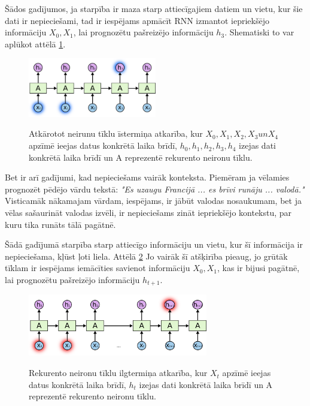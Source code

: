\documentclass[12pt,paper=A4]{report}
\begin{document}
    Šādos gadījumos, ja starpība ir maza starp attiecīgajiem datiem un vietu, kur šie dati ir nepieciešami, tad ir iespējams apmācīt RNN izmantot iepriekšējo informāciju $X_0, X_1$, lai prognozētu pašreizējo informāciju $h_3$. Shematiski to var aplūkot attēlā \ref{RNNshorttermdepdencies}. 

\begin{figure}[H] \centering
\includegraphics[width=0.50\textwidth]{RNNshorttermdepdencies} 
\caption{Atkārotot neirunu tīklu īstermiņa atkarība, kur $X_0,X_1, X_2, X_3 un X_4$ apzīmē ieejas datus konkrētā laika brīdī, $h_0,h_1, h_2, h_3, h_4$ izejas dati konkrētā laika brīdī un A reprezentē rekurento neironu tīklu.} 
\cite{ANNTutorial}
 \label{RNNshorttermdepdencies} 
\end{figure}

Bet ir arī gadījumi, kad nepieciešams vairāk konteksta. Piemēram ja vēlamies prognozēt pēdējo vārdu tekstā: \textit{"Es uzaugu Francijā ... es brīvi runāju ... valodā."} Visticamāk nākamajam vārdam, iespējams, ir jābūt valodas nosaukumam, bet ja vēlas sašaurināt valodas izvēli, ir nepieciešams zināt iepriekšējo kontekstu, par kuru tika runāts tālā pagātnē. 

Šādā gadījumā starpība starp attiecīgo informāciju un vietu, kur šī informācija ir nepieciešama, kļūst ļoti liela. Attēlā \ref{RNNlongtermdependencies} Jo vairāk šī atšķirība pieaug, jo grūtāk tīklam ir iespējams iemācīties savienot informāciju $X_0,X_1$, kas ir bijusi pagātnē, lai prognozētu pašreizējo informāciju $h_{t+1}$. 

\begin{figure}[H] \centering
\includegraphics[width=0.70\textwidth]{RNNlongtermdependencies} 
\caption{Rekurento neironu tīklu ilgtermiņa atkarība, kur $X_t$ apzīmē ieejas datus konkrētā laika brīdī, $h_t$ izejas dati konkrētā laika brīdī un A reprezentē rekurento neironu tīklu.} 
\cite{ANNTutorial} \label{RNNlongtermdependencies} 
\end{figure}	
		
\end{document}
